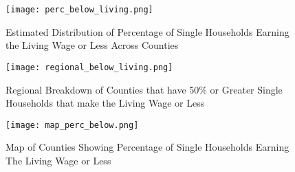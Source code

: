 \begin{figure}[H]
    \centering
        \texttt{[image: perc\_below\_living.png]}
        \caption{Estimated Distribution of Percentage of Single Households Earning the Living Wage or Less Across Counties}
    \label{f:ch5_perc_below_living}
\end{figure}

\begin{figure}[H]
    \centering
        \texttt{[image: regional\_below\_living.png]}
        \caption{Regional Breakdown of Counties that have 50\% or Greater Single Households that make the Living Wage or Less}
    \label{f:ch5_regional_below_living}
\end{figure}

\begin{figure}[H]
\texttt{[image: map\_perc\_below.png]}
    \centering
        \caption{Map of Counties Showing Percentage of Single Households Earning The Living Wage or Less}
    \label{f:ch5_map_perc_below}
\end{figure}